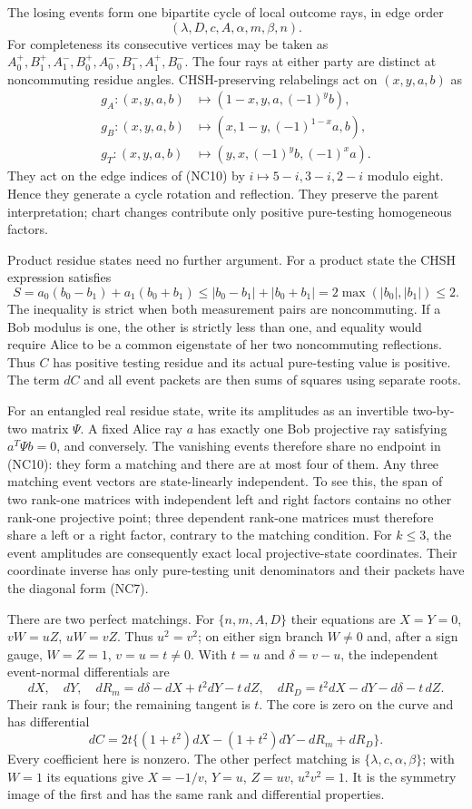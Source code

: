 The losing events form one bipartite cycle of local outcome rays,
in edge order
\[
 (\lambda,D,c,A,\alpha,m,\beta,n).                   \tag{NC10}
\]
For completeness its consecutive vertices may be taken as
$A_0^+,B_1^+,A_1^-,B_0^+,A_0^-,B_1^-,A_1^+,B_0^-$.
The four rays at either party are distinct at noncommuting residue
angles. CHSH-preserving relabelings act on $(x,y,a,b)$ as
\[
\begin{split}
g_A:(x,y,a,b)&\mapsto(1-x,y,a,(-1)^yb),\\
g_B:(x,y,a,b)&\mapsto(x,1-y,(-1)^{1-x}a,b),\\
g_T:(x,y,a,b)&\mapsto(y,x,(-1)^yb,(-1)^xa).
\end{split}
\]
They act on the edge indices of (NC10) by $i\mapsto5-i,3-i,2-i$
modulo eight. Hence they generate a cycle rotation and reflection.
They preserve the parent interpretation; chart changes contribute
only positive pure-testing homogeneous factors.

Product residue states need no further argument. For a product state
the CHSH expression satisfies
\[
 S=a_0(b_0-b_1)+a_1(b_0+b_1)
 \le |b_0-b_1|+|b_0+b_1|=2\max(|b_0|,|b_1|)\le2.
\]
The inequality is strict when both measurement pairs are
noncommuting. If a Bob modulus is one, the other is strictly less
than one, and equality would require Alice to be a common eigenstate
of her two noncommuting reflections. Thus $C$ has positive testing
residue and its actual pure-testing value is positive. The term $dC$
and all event packets are then sums of squares using separate roots.

For an entangled real residue state, write its amplitudes as an
invertible two-by-two matrix $\Psi$. A fixed Alice ray $a$ has
exactly one Bob projective ray satisfying $a^T\Psi b=0$, and
conversely. The vanishing events therefore share no endpoint in
(NC10): they form a matching and there are at most four of them.
Any three matching event vectors are state-linearly independent.
To see this, the span of two rank-one matrices with independent
left and right factors contains no other rank-one projective point;
three dependent rank-one matrices must therefore share a left or a
right factor, contrary to the matching condition. For $k\le3$, the
event amplitudes are consequently exact local projective-state
coordinates. Their coordinate inverse has only pure-testing unit
denominators and their packets have the diagonal form (NC7).

There are two perfect matchings. For $\{n,m,A,D\}$ their equations
are $X=Y=0$, $vW=uZ$, $uW=vZ$. Thus $u^2=v^2$; on either sign
branch $W\ne0$ and, after a sign gauge, $W=Z=1$, $v=u=t\ne0$.
With $t=u$ and $\delta=v-u$, the independent event-normal differentials are
\[
 dX,\quad dY,\quad
 dR_m=d\delta-dX+t^2dY-t\,dZ,\quad
 dR_D=t^2dX-dY-d\delta-t\,dZ.
\]
Their rank is four; the remaining tangent is $t$. The core is zero
on the curve and has differential
\[
 dC=2t\{(1+t^2)dX-(1+t^2)dY-dR_m+dR_D\}.           \tag{NC11}
\]
Every coefficient here is nonzero. The other perfect matching is
$\{\lambda,c,\alpha,\beta\}$; with $W=1$ its equations give
$X=-1/v$, $Y=u$, $Z=uv$, $u^2v^2=1$. It is the symmetry image
of the first and has the same rank and differential properties.

